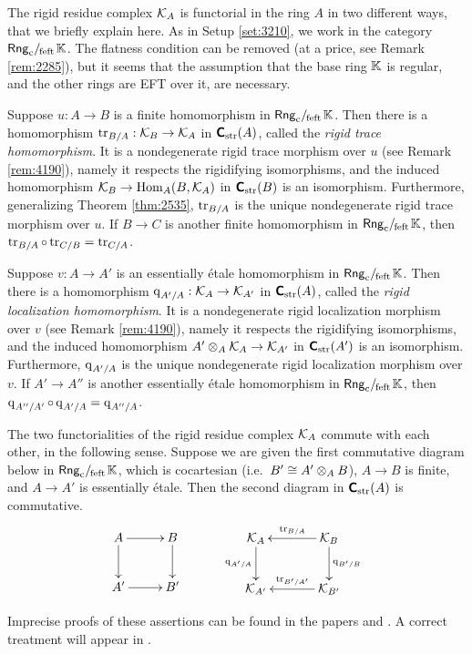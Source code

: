 \begin{rem} \label{rem:4191}   
The rigid residue complex $\mathcal{K}_{A}$ is functorial in the ring $A$ in two 
different ways, that we briefly explain here. As in Setup \ref{set:3210}, we 
work in the category $\mathrm{\mathsf{Rng}}_{\mathrm{c}} /_{\mspace{-2mu} \mathrm{feft}} \mspace{2mu} \mathbb{K}$. The flatness condition can be removed 
(at a price, see Remark \ref{rem:2285}), but it seems that the assumption that 
the base ring $\mathbb{K}$ is regular, and the other rings are EFT over it, are 
necessary.  
 
Suppose $u : A \to B$ is a finite homomorphism in $\mathrm{\mathsf{Rng}}_{\mathrm{c}} /_{\mspace{-2mu} \mathrm{feft}} \mspace{2mu} \mathbb{K}$. 
Then there is a homomorphism 
$\operatorname{tr}_{B / A} : \mathcal{K}_B \to \mathcal{K}_A$
in $\boldsymbol{\mathsf{C}}_{\mathrm{str}}(A)$, called the {\em rigid trace homomorphism}. 
It is a nondegenerate rigid trace morphism over $u$ (see Remark \ref{rem:4190}),
namely it respects the rigidifying isomorphisms, and the induced homomorphism 
$\mathcal{K}_B \to \operatorname{Hom}_{A}(B, \mathcal{K}_A)$
in $\boldsymbol{\mathsf{C}}_{\mathrm{str}}(B)$ is an isomorphism. Furthermore, generalizing 
Theorem \ref{thm:2535}, $\operatorname{tr}_{B / A}$ is the unique 
nondegenerate rigid trace morphism over $u$. If $B \to C$ is another finite 
homomorphism in $\mathrm{\mathsf{Rng}}_{\mathrm{c}} /_{\mspace{-2mu} \mathrm{feft}} \mspace{2mu} \mathbb{K}$, then 
$\operatorname{tr}_{B / A} \circ \operatorname{tr}_{C / B}  = \operatorname{tr}_{C / A}$.

Suppose $v : A \to A'$ is an essentially \'etale homomorphism in 
$\mathrm{\mathsf{Rng}}_{\mathrm{c}} /_{\mspace{-2mu} \mathrm{feft}} \mspace{2mu} \mathbb{K}$. Then there is a homomorphism 
$\operatorname{q}_{A' / A} : \mathcal{K}_{A} \to \mathcal{K}_{A'}$
in $\boldsymbol{\mathsf{C}}_{\mathrm{str}}(A)$, called the {\em rigid localization homomorphism}. 
It is a nondegenerate rigid localization morphism over $v$ (see Remark 
\ref{rem:4190}), namely it respects the rigidifying isomorphisms, and the 
induced homomorphism 
$A' \otimes_{A} \mathcal{K}_{A} \to \mathcal{K}_{A'}$
in $\boldsymbol{\mathsf{C}}_{\mathrm{str}}(A')$ is an isomorphism. Furthermore,
$\operatorname{q}_{A' / A}$ is the unique nondegenerate rigid localization morphism over 
$v$. If $A' \to A''$ is another essentially \'etale homomorphism in 
$\mathrm{\mathsf{Rng}}_{\mathrm{c}} /_{\mspace{-2mu} \mathrm{feft}} \mspace{2mu} \mathbb{K}$, then 
$\operatorname{q}_{A'' / A'} \circ \operatorname{q}_{A' / A} = \operatorname{q}_{A'' / A}$.

The two functorialities of the rigid residue complex $\mathcal{K}_A$ commute with each 
other, in the following sense. Suppose we are given the first commutative 
diagram below in $\mathrm{\mathsf{Rng}}_{\mathrm{c}} /_{\mspace{-2mu} \mathrm{feft}} \mspace{2mu} \mathbb{K}$, which is cocartesian (i.e.\ 
$B' \cong A' \otimes_A B$), $A \to B$ is finite, and $A \to A'$ is essentially 
\'etale. Then the second diagram in $\boldsymbol{\mathsf{C}}_{\mathrm{str}}(A)$ is commutative. 
\[ 
\UseTips \xymatrix @C=6ex @R=6ex {
A
\ar[r]^{}
\ar[d]_{}
&
B
\ar[d]
\\
A' 
\ar[r]
&
B'
}
\qquad \quad 
\UseTips \xymatrix @C=8ex @R=6ex {
\KK_{A}
\ar[d]_{\opn{q}_{A' / A}}
&
\KK_{B}
\ar[l]_{\opn{tr}_{B / A}}
\ar[d]^{\opn{q}_{B' / B}}
\\
\KK_{A'}
&
\KK_{B'}
\ar[l]_{\opn{tr}_{B' / A'}}
} 
\]

Imprecise proofs of these assertions can be found in the papers \cite{ YeZh3} 
and \cite{YeZh4}. A correct treatment will appear in \cite{Ye11}. 
\end{rem}

